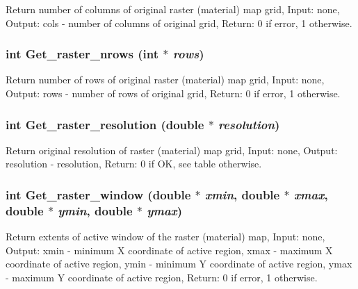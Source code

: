 Return number of columns of original raster (material) map grid, Input: none, Output: cols - number of columns of original grid, Return: 0 if error, 1 otherwise. 

\hypertarget{GisApi_8C_a62}{
\subsubsection[Get\_\-raster\_\-nrows]{\setlength{\rightskip}{0pt plus 5cm}int Get\_\-raster\_\-nrows (int $\ast$ {\em rows})}}
\label{GisApi_8C_a62}


Return number of rows of original raster (material) map grid, Input: none, Output: rows - number of rows of original grid, Return: 0 if error, 1 otherwise. 

\hypertarget{GisApi_8C_a61}{
\subsubsection[Get\_\-raster\_\-resolution]{\setlength{\rightskip}{0pt plus 5cm}int Get\_\-raster\_\-resolution (double $\ast$ {\em resolution})}}
\label{GisApi_8C_a61}


Return original resolution of raster (material) map grid, Input: none, Output: resolution - resolution, Return: 0 if OK, see table otherwise. 

\hypertarget{GisApi_8C_a58}{
\subsubsection[Get\_\-raster\_\-window]{\setlength{\rightskip}{0pt plus 5cm}int Get\_\-raster\_\-window (double $\ast$ {\em xmin}, double $\ast$ {\em xmax}, double $\ast$ {\em ymin}, double $\ast$ {\em ymax})}}
\label{GisApi_8C_a58}


Return extents of active window of the raster (material) map, Input: none, Output: xmin - minimum X coordinate of active region, xmax - maximum X coordinate of active region, ymin - minimum Y coordinate of active region, ymax - maximum Y coordinate of active region, Return: 0 if error, 1 otherwise. 

